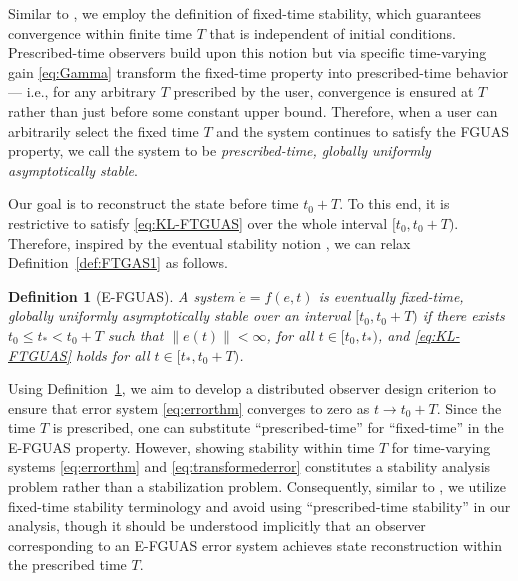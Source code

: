 \documentclass[journal]{IEEEtran}
\newtheorem{definition}{Definition}
\begin{document}
Similar to \cite{Holloway19}, we employ the definition of fixed-time stability, which guarantees convergence within finite time $T$ that is independent of initial conditions. 
Prescribed-time observers build upon this notion but via specific time-varying gain \eqref{eq:Gamma} transform the fixed-time property into prescribed-time behavior--- i.e., for any arbitrary $T$ prescribed by the user, convergence is ensured at $T$ rather than just before some constant upper bound.
Therefore, when a user can arbitrarily select the fixed time $T$ and the system continues to satisfy the FGUAS property, we call the system to be \textit{prescribed-time, globally uniformly asymptotically stable}.

Our goal is to reconstruct the state before time $t_0+T$. To this end, it is restrictive to satisfy \eqref{eq:KL-FTGUAS} over the whole interval $[t_0,t_0+T)$. Therefore, inspired by the eventual stability notion \cite{lasalle1963}, we can relax Definition~\ref{def:FTGAS1} as follows.

\begin{definition}[E-FGUAS]
\label{def:eFTGUAS}
A system $\dot e = f(e,t)$ is \emph{eventually fixed-time, globally uniformly asymptotically stable} over an interval $[t_0,t_0+T)$ if there exists $t_0\leq t_*<t_0+T$ such that $\|e(t)\|<\infty$, for all $t\in[t_0,t_*)$, and \eqref{eq:KL-FTGUAS} holds for all $t\in[t_*,t_0+T)$.
\end{definition}

Using Definition~\ref{def:eFTGUAS}, we aim to develop a distributed observer design criterion to ensure that error system \eqref{eq:errorthm} converges to zero as $t\to t_0+T$.
Since the time $T$ is prescribed, one can substitute ``prescribed-time'' for ``fixed-time'' in the E-FGUAS property.
However, showing stability within time $T$ for time-varying systems \eqref{eq:errorthm} and \eqref{eq:transformederror} constitutes a stability analysis problem rather than a stabilization problem.
Consequently, similar to \cite{Holloway19}, we utilize fixed-time stability terminology and avoid using ``prescribed-time stability'' in our analysis, though it should be understood implicitly that an observer corresponding to an E-FGUAS error system achieves state reconstruction within the prescribed time $T$.



\end{document}
